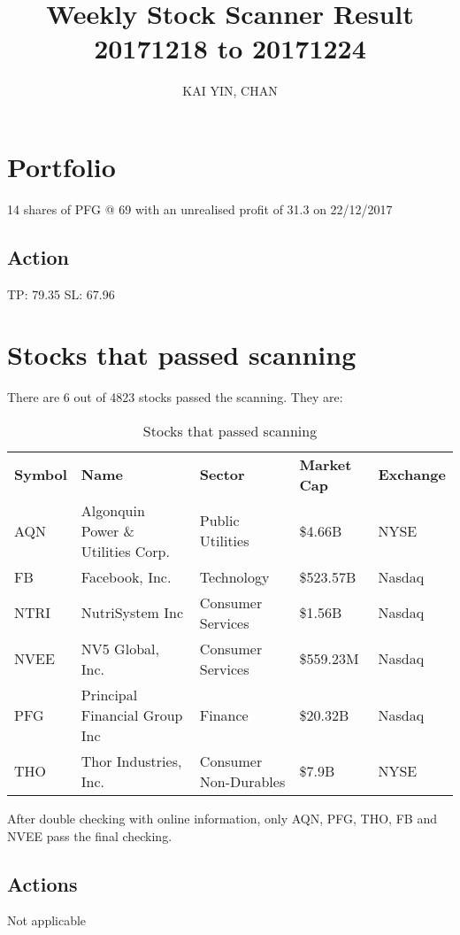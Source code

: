 \documentclass{article}
\begin{document}
\title{Weekly Stock Scanner Result \\ 20171218 to 20171224}
\author{KAI YIN, CHAN}
\maketitle

\section{Portfolio}
14 shares of PFG @ 69 with an unrealised profit of 31.3 on 22/12/2017

\subsection{Action}
TP: 79.35 SL: 67.96

\section{Stocks that passed scanning}

There are 6 out of 4823 stocks passed the scanning.  They are:
\begin{table}[htbp]
  \caption{Stocks that passed scanning}
    \begin{tabular}{lllll}
    \textbf{Symbol} & \textbf{Name} & \textbf{Sector} & \textbf{Market Cap} & \textbf{Exchange} \\
    AQN   & Algonquin Power \& Utilities Corp. & Public Utilities & \$4.66B & NYSE \\
    FB    & Facebook, Inc. & Technology & \$523.57B & Nasdaq \\
    NTRI  & NutriSystem Inc & Consumer Services & \$1.56B & Nasdaq \\
    NVEE  & NV5 Global, Inc. & Consumer Services & \$559.23M & Nasdaq \\
    PFG   & Principal Financial Group Inc & Finance & \$20.32B & Nasdaq \\
    THO   & Thor Industries, Inc. & Consumer Non-Durables & \$7.9B & NYSE \\
    \end{tabular}%
  \label{tab:addlabel}%
\end{table}%

After double checking with online information, only AQN, PFG, THO, FB and NVEE pass the final checking.

\subsection{Actions}
Not applicable
\end{document}
